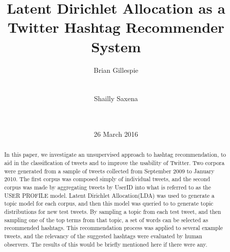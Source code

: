 \documentclass{acm_proc_article-sp}
\begin{document}
\title{Latent Dirichlet Allocation as a Twitter Hashtag Recommender System
	}



\author{
\alignauthor
Brian Gillespie\\
       \\
       \\
\alignauthor
Shailly Saxena\\
       \\
       \\
}

\date{26 March 2016}



\maketitle
\begin{abstract}
\hspace*{5mm}In this paper, we investigate an unsupervised approach to hashtag recommendation, to aid in the classification of tweets and to improve the usability of Twitter. Two corpora were generated from a sample of tweets collected from September 2009 to January 2010. The first corpus was composed simply of individual tweets, and the second corpus was made by aggregating tweets by UserID into what is referred to as the USER PROFILE model. Latent Dirichlet Allocation(LDA) was used to generate a topic model for each corpus, and then this model was queried to to generate topic distributions for new test tweets. By sampling a topic from each test tweet, and then sampling one of the top terms from that topic, a set of words can be selected as recommended hashtags. This recommendation process was applied to several example tweets, and the relevancy of the suggested hashtags were evaluated by human observers. The results of this would be briefly mentioned here if there were any.
\end{abstract}

\end{document}
